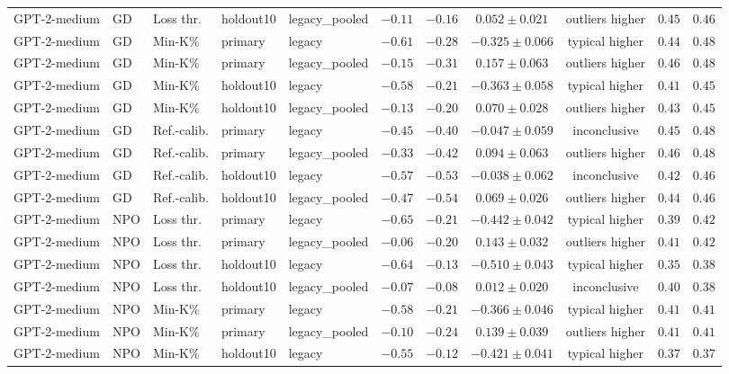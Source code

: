 {\begin{longtable}{@{\extracolsep{\fill}}lllllcccccc@{}}
GPT-2-medium & GD & Loss thr. & holdout10 & legacy\_pooled & $-0.11$ & $-0.16$ & $0.052 \pm 0.021$ & outliers higher & $0.45$ & $0.46$ \\
GPT-2-medium & GD & Min-K\% & primary & legacy & $-0.61$ & $-0.28$ & $-0.325 \pm 0.066$ & typical higher & $0.44$ & $0.48$ \\
GPT-2-medium & GD & Min-K\% & primary & legacy\_pooled & $-0.15$ & $-0.31$ & $0.157 \pm 0.063$ & outliers higher & $0.46$ & $0.48$ \\
GPT-2-medium & GD & Min-K\% & holdout10 & legacy & $-0.58$ & $-0.21$ & $-0.363 \pm 0.058$ & typical higher & $0.41$ & $0.45$ \\
GPT-2-medium & GD & Min-K\% & holdout10 & legacy\_pooled & $-0.13$ & $-0.20$ & $0.070 \pm 0.028$ & outliers higher & $0.43$ & $0.45$ \\
GPT-2-medium & GD & Ref.-calib. & primary & legacy & $-0.45$ & $-0.40$ & $-0.047 \pm 0.059$ & inconclusive & $0.45$ & $0.48$ \\
GPT-2-medium & GD & Ref.-calib. & primary & legacy\_pooled & $-0.33$ & $-0.42$ & $0.094 \pm 0.063$ & outliers higher & $0.46$ & $0.48$ \\
GPT-2-medium & GD & Ref.-calib. & holdout10 & legacy & $-0.57$ & $-0.53$ & $-0.038 \pm 0.062$ & inconclusive & $0.42$ & $0.46$ \\
GPT-2-medium & GD & Ref.-calib. & holdout10 & legacy\_pooled & $-0.47$ & $-0.54$ & $0.069 \pm 0.026$ & outliers higher & $0.44$ & $0.46$ \\
GPT-2-medium & NPO & Loss thr. & primary & legacy & $-0.65$ & $-0.21$ & $-0.442 \pm 0.042$ & typical higher & $0.39$ & $0.42$ \\
GPT-2-medium & NPO & Loss thr. & primary & legacy\_pooled & $-0.06$ & $-0.20$ & $0.143 \pm 0.032$ & outliers higher & $0.41$ & $0.42$ \\
GPT-2-medium & NPO & Loss thr. & holdout10 & legacy & $-0.64$ & $-0.13$ & $-0.510 \pm 0.043$ & typical higher & $0.35$ & $0.38$ \\
GPT-2-medium & NPO & Loss thr. & holdout10 & legacy\_pooled & $-0.07$ & $-0.08$ & $0.012 \pm 0.020$ & inconclusive & $0.40$ & $0.38$ \\
GPT-2-medium & NPO & Min-K\% & primary & legacy & $-0.58$ & $-0.21$ & $-0.366 \pm 0.046$ & typical higher & $0.41$ & $0.41$ \\
GPT-2-medium & NPO & Min-K\% & primary & legacy\_pooled & $-0.10$ & $-0.24$ & $0.139 \pm 0.039$ & outliers higher & $0.41$ & $0.41$ \\
GPT-2-medium & NPO & Min-K\% & holdout10 & legacy & $-0.55$ & $-0.12$ & $-0.421 \pm 0.041$ & typical higher & $0.37$ & $0.37$ \\

\end{longtable}}
